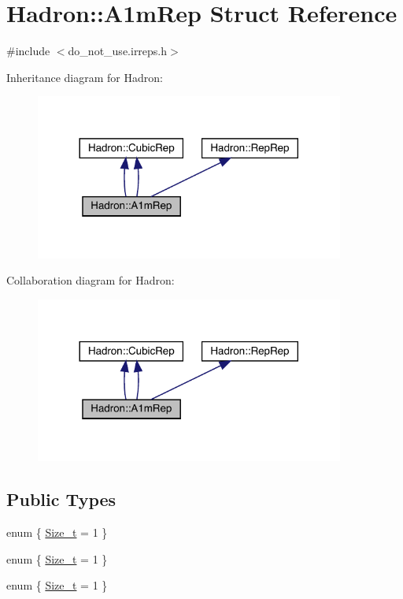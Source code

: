 \hypertarget{structHadron_1_1A1mRep}{}\section{Hadron\+:\+:A1m\+Rep Struct Reference}
\label{structHadron_1_1A1mRep}


{\ttfamily \#include $<$do\+\_\+not\+\_\+use.\+irreps.\+h$>$}



Inheritance diagram for Hadron\+:\nopagebreak
\begin{figure}[H]
\begin{center}
\leavevmode
\includegraphics[width=288pt]{d3/da5/structHadron_1_1A1mRep__inherit__graph}
\end{center}
\end{figure}


Collaboration diagram for Hadron\+:\nopagebreak
\begin{figure}[H]
\begin{center}
\leavevmode
\includegraphics[width=288pt]{db/d4a/structHadron_1_1A1mRep__coll__graph}
\end{center}
\end{figure}
\subsection*{Public Types}
\begin{DoxyCompactItemize}
\item 
enum \{ \mbox{\hyperlink{structHadron_1_1A1mRep_ad964ac3420710c762ecc2d3475853e3aa36c9812a16421080e6dfdf2635eaa804}{Size\+\_\+t}} = 1
 \}
\item 
enum \{ \mbox{\hyperlink{structHadron_1_1A1mRep_ad964ac3420710c762ecc2d3475853e3aa36c9812a16421080e6dfdf2635eaa804}{Size\+\_\+t}} = 1
 \}
\item 
enum \{ \mbox{\hyperlink{structHadron_1_1A1mRep_ad964ac3420710c762ecc2d3475853e3aa36c9812a16421080e6dfdf2635eaa804}{Size\+\_\+t}} = 1
 \}
\end{DoxyCompactItemize}
